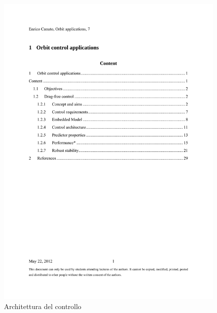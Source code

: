 \begin{figure}
\includegraphics[page=13, trim=2.5cm 18.5cm 3cm 3cm,
clip=true,width=\textwidth]{control/orbit_control/images/cap7.pdf}
\caption{Architettura del controllo}
\end{figure}

